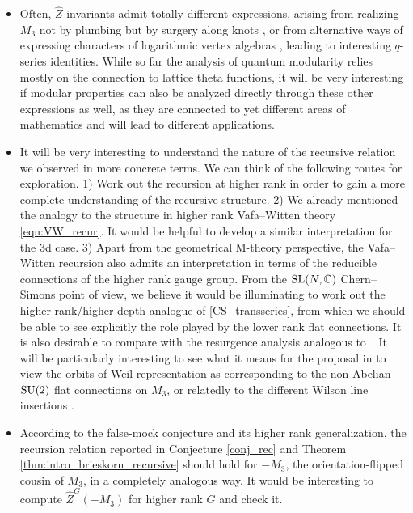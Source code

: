 \documentclass[pdftex]{sigma}
\theoremstyle{definition}
\numberwithin{equation}{section}
\begin{document}
\begin{itemize}
 \item Often, $\widehat Z$-invariants admit totally different expressions, arising from realizing $M_3$ not by plumbing but by surgery along knots \cite{Chung:2022ypb, Ekholm:2021irc, Ekholm:2020lqy,gukov2019two, Park:2019xey}, %
     or from alternative ways of expressing characters of logarithmic vertex algebras \cite{chengUpC}, leading to interesting $q$-series identities. While so far the analysis of quantum modularity relies mostly on the connection to lattice theta functions, it will be very interesting if modular properties can also be analyzed
 directly through these other expressions as well, as they are connected to yet different areas of mathematics and will lead to different applications.
 \item It will be very interesting to understand the nature of the recursive relation we observed in more concrete terms. We can think of the following routes for exploration. 1) Work out the recursion at higher rank in order to gain a more complete understanding of the recursive structure. 2) We already mentioned the analogy to the structure in higher rank Vafa--Witten theory \eqref{eqn:VW_recur}. It would be helpful to develop a similar interpretation for the 3d case. 3) Apart from the geometrical M-theory perspective, the Vafa--Witten recursion also admits an interpretation in terms of the reducible connections of the higher rank gauge group. From the ${\rm SL}(N,\mathbb C)$ Chern--Simons point of view, we believe it would be illuminating to work out the higher rank/higher depth analogue of \eqref{CS_transseries}, from which we should be able to see explicitly the role played by the lower rank flat connections. It is also desirable to compare with the resurgence analysis analogous to~\cite{Gukov:2016njj}. It will be particularly interesting to see what it means for the proposal in \cite{cheng20193d} to view the orbits of Weil representation as corresponding to the non-Abelian ${\rm SU}(2)$ flat connections on $M_3$, or relatedly to the different Wilson line insertions \cite{Gukov:2016gkn}. %
 \item According to the false-mock conjecture \cite{cheng20193d} %
  and its higher rank generalization, the recursion relation reported in Conjecture \ref{conj_rec} and Theorem \ref{thm:intro_brieskorn_recursive} should hold for $-M_3$, the orientation-flipped cousin of $M_3$, in a completely analogous way. It would be interesting to compute $\hat Z^G(-M_3)$ for higher rank $G$ and check it.
\end{itemize}
\end{document}
